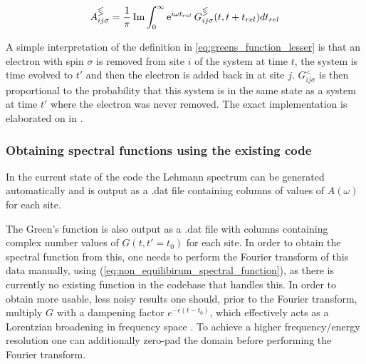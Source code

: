 \begin{equation}
    A_{ij\sigma}^\gtlt = \frac{1}{\pi} \operatorname{Im}\int_0^\infty \operatorname{e}^{i\omega t_{rel}} G_{ij\sigma}^\gtlt (t,t+t_{rel}) dt_{rel}\label{eq:non_equilibirum_spectral_function}
\end{equation}

A simple interpretation of the definition in \ref{eq:greens_function_lesser} is that an electron with spin $\sigma$ is removed from site $i$ of the system at time $t$, the system is time evolved to $t'$ and then the electron is added back in at site $j$. $G_{ij\sigma}^{<}$ is then proportional to the probability that this system is in the same state as a system at time $t'$ where the electron was never removed. The exact implementation is elaborated on in \cite{worm_bachelor}. 

\subsubsection{Obtaining spectral functions using the existing code}

In the current state of the code the Lehmann spectrum can be generated automatically and is output as a .dat file containing columns of values of $A(\omega)$ for each site.

\bigskip
The Green's function is also output as a .dat file with columns containing complex number values of $G(t,t'=t_0)$ for each site. In order to obtain the spectral function from this, one needs to perform the Fourier transform of this data manually, using (\ref{eq:non_equilibirum_spectral_function}), as there is currently no existing function in the codebase that handles this. In order to obtain more usable, less noisy results one should, prior to the Fourier transform, multiply $G$ with a dampening factor $e^{-\epsilon (t-t_0)}$, which effectively acts as a Lorentzian broadening in frequency space \cite{spectral_function}. To achieve a higher frequency/energy resolution one can additionally zero-pad the domain before performing the Fourier transform. 